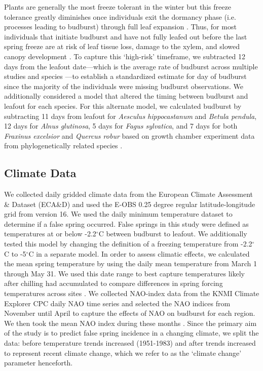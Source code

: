\documentclass{article}\usepackage[]{graphicx}\usepackage[]{color}
\begin{document}
Plants are generally the most freeze tolerant in the winter but this freeze tolerance greatly diminishes once individuals exit the dormancy phase (i.e. processes leading to budburst) through full leaf expansion \citep{Lenz2016, Vitasse2014}. Thus, for most individuals that initiate budburst and have not fully leafed out before the last spring freeze are at risk of leaf tissue loss, damage to the xylem, and slowed canopy development \citep{Gu2008,Hufkens2012}. To capture this `high-risk' timeframe, we subtracted 12 days from the leafout date---which is the average rate of budburst across multiple studies and species \citep{Donnelly2017,Flynn2018,NPN2019}---to establish a standardized estimate for day of budburst since the majority of the individuals were missing budburst observations. 
We additionally considered a model that altered the timing between budburst and leafout for each species. For this alternate model, we calculated budburst by subtracting 11 days from leafout for \textit{Aesculus hippocastanum} and \textit{Betula pendula}, 12 days for \textit{Alnus glutinosa}, 5 days for \textit{Fagus sylvatica}, and 7 days for both \textit{Fraxinus excelsior} and \textit{Quercus robur} based on growth chamber experiment data from phylogenetically related species \citep{Buerki2010, Flynn2018, Hipp2017, Wang2016}.

\subsection*{Climate Data}
We collected daily gridded climate data from the European Climate Assessment \& Dataset (ECA\&D) and used the E-OBS 0.25 degree regular latitude-longitude grid from version 16. We used the daily minimum temperature dataset to determine if a false spring occurred. False springs in this study were defined as temperatures at or below -2.2$^{\circ}$C \citep{Schwartz1993} between budburst to leafout. We additionally tested this model by changing the definition of a freezing temperature from -2.2$^{\circ}$C \citep{Schwartz1993} to -5$^{\circ}$C \citep{Lenz2013, Sakai1987} in a separate model. In order to assess climatic effects, we calculated the mean spring temperature by using the daily mean temperature from March 1 through May 31. We used this date range to best capture temperatures likely after chilling had accumulated to compare differences in spring forcing temperatures across sites \citep{Basler2012, Korner2016}. We collected NAO-index data from the KNMI Climate Explorer CPC daily NAO time series and selected the NAO indices from November until April to capture the effects of NAO on budburst for each region. We then took the mean NAO index during these months \citep{NAOdata}. Since the primary aim of the study is to predict false spring incidence in a changing climate, we split the data: before temperature trends increased (1951-1983) and after trends increased \citep[1984-2016,][]{Stocker2013,Kharouba2018} to represent recent climate change, which we refer to as the `climate change' parameter henceforth.
\end{document}
